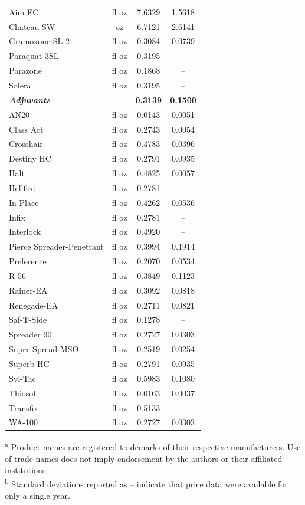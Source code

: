 \begin{table}[ht]
\begin{tabular}{lccc}
\hline
Aim EC & fl oz & 7.6329 & 1.5618 \\
Chateau SW & oz & 6.7121 & 2.6141 \\
Gramoxone SL 2 & fl oz & 0.3084 & 0.0739 \\
Paraquat 3SL & fl oz & 0.3195 & -- \\
Parazone & fl oz & 0.1868 & -- \\
Solera & fl oz & 0.3195 & -- \\
\hline
\textbf{\textit{Adjuvants}} & & \textbf{0.3139} & \textbf{0.1500} \\
\hline
AN20 & fl oz & 0.0143 & 0.0051 \\
Class Act & fl oz & 0.2743 & 0.0054 \\
Crosshair & fl oz & 0.4783 & 0.0396 \\
Destiny HC & fl oz & 0.2791 & 0.0935 \\
Halt & fl oz & 0.4825 & 0.0057 \\
Hellfire & fl oz & 0.2781 & -- \\
In-Place & fl oz & 0.4262 & 0.0536 \\
Infix & fl oz & 0.2781 & -- \\
Interlock & fl oz & 0.4920 & -- \\
Pierce Spreader-Penetrant & fl oz & 0.3994 & 0.1914 \\
Preference & fl oz & 0.2070 & 0.0534 \\
R-56 & fl oz & 0.3849 & 0.1123 \\
Rainer-EA & fl oz & 0.3092 & 0.0818 \\
Renegade-EA & fl oz & 0.2711 & 0.0821 \\
Saf-T-Side & fl oz & 0.1278 & -- \\
Spreader 90 & fl oz & 0.2727 & 0.0303 \\
Super Spread MSO & fl oz & 0.2519 & 0.0254 \\
Superb HC & fl oz & 0.2791 & 0.0935 \\
Syl-Tac & fl oz & 0.5983 & 0.1080 \\
Thiosol & fl oz & 0.0163 & 0.0037 \\
Transfix & fl oz & 0.5133 & -- \\
WA-100 & fl oz & 0.2727 & 0.0303 \\
\hline
\end{tabular}
\vspace{4pt}
\par
\raggedright
\scriptsize
\textsuperscript{a} Product names are registered trademarks of their respective manufacturers. Use of trade names does not imply endorsement by the authors or their affiliated institutions.\\
\textsuperscript{b} Standard deviations reported as -- indicate that price data were available for only a single year.
\end{table}